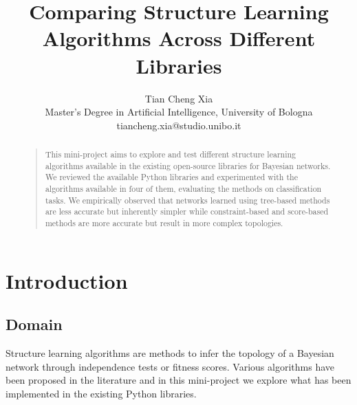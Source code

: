 \documentclass[letterpaper]{article}
\begin{document}
%
\title{Comparing Structure Learning Algorithms Across Different Libraries}
\author{Tian Cheng Xia\\
Master's Degree in Artificial Intelligence, University of Bologna\\
tiancheng.xia@studio.unibo.it
}
\maketitle



\begin{abstract}
\begin{quote}

This mini-project aims to explore and test different structure learning algorithms available
in the existing open-source libraries for Bayesian networks.
We reviewed the available Python libraries and 
experimented with the algorithms available in four of them, evaluating the methods on classification tasks.
We empirically observed that networks learned using tree-based methods are less accurate but inherently simpler while
constraint-based and score-based methods are more accurate but result in more complex topologies.


\end{quote}
\end{abstract}


\section{Introduction}

\subsection{Domain}
Structure learning algorithms are methods to infer the topology of a Bayesian network through independence tests or fitness scores.
Various algorithms have been proposed in the literature and in this mini-project we explore what has been implemented in the existing Python libraries.
\end{document}
